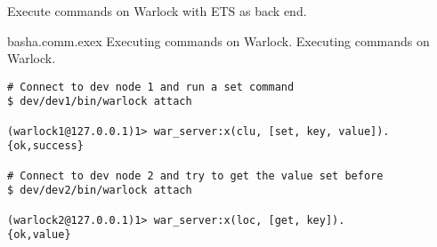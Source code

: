 Execute commands on Warlock with ETS as back end.

\begin{scode}{bash}{a.comm.exex}{%
  Executing commands on Warlock.}{%
  Executing commands on Warlock.}
  \begin{lstlisting}
# Connect to dev node 1 and run a set command  
$ dev/dev1/bin/warlock attach

(warlock1@127.0.0.1)1> war_server:x(clu, [set, key, value]).
{ok,success}

# Connect to dev node 2 and try to get the value set before
$ dev/dev2/bin/warlock attach

(warlock2@127.0.0.1)1> war_server:x(loc, [get, key]).
{ok,value}
  \end{lstlisting}
\end{scode}
